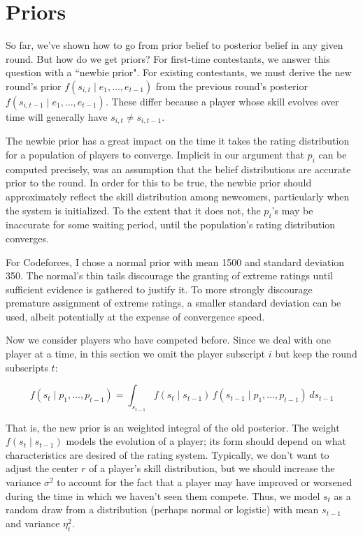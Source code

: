 
\section{Priors}

So far, we've shown how to go from prior belief to posterior belief in any given round. But how do we get priors? For first-time contestants, we answer this question with a ``newbie prior". For existing contestants, we must derive the new round's prior $f(s_{i,t} \mid e_1,\ldots,e_{t-1})$ from the previous round's posterior $f(s_{i,t-1} \mid e_1,\ldots,e_{t-1})$. These differ because a player whose skill evolves over time will generally have $s_{i,t} \ne s_{i,t-1}$.

The newbie prior has a great impact on the time it takes the rating distribution for a population of players to converge. Implicit in our argument that $p_i$ can be computed precisely, was an assumption that the belief distributions are accurate prior to the round. In order for this to be true, the newbie prior should approximately reflect the skill distribution among newcomers, particularly when the system is initialized. To the extent that it does not, the $p_i$'s may be inaccurate for some waiting period, until the population's rating distribution converges.

For Codeforces, I chose a normal prior with mean 1500 and standard deviation 350. The normal's thin tails discourage the granting of extreme ratings until sufficient evidence is gathered to justify it. To more strongly discourage premature assignment of extreme ratings, a smaller standard deviation can be used, albeit potentially at the expense of convergence speed.

Now we consider players who have competed before. Since we deal with one player at a time, in this section we omit the player subscript $i$ but keep the round subscripts $t$:

\[
f(s_t \mid p_1,\ldots,p_{t-1})
= \int_{s_{t-1}} f(s_t \mid s_{t-1}) \, f(s_{t-1} \mid p_1,\ldots,p_{t-1}) \,ds_{t-1}
\]

That is, the new prior is an weighted integral of the old posterior. The weight $f(s_t \mid s_{t-1})$ models the evolution of a player; its form should depend on what characteristics are desired of the rating system. Typically, we don't want to adjust the center $r$ of a player's skill distribution, but we should increase the variance $\sigma^2$ to account for the fact that a player may have improved or worsened during the time in which we haven't seen them compete. Thus, we model $s_t$ as a random draw from a distribution (perhaps normal or logistic) with mean $s_{t-1}$ and variance $\eta_t^2$.

